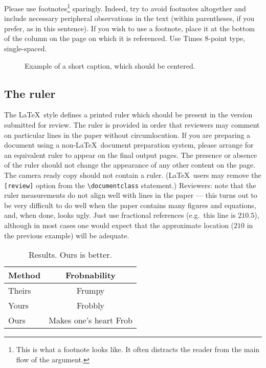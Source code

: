 \documentclass[extendedabs]{recpad2k}
\begin{document}
 Please use footnotes\footnote {This is what a footnote looks like.  It
 often distracts the reader from the main flow of the argument.} sparingly.
 Indeed, try to avoid footnotes altogether and include necessary peripheral
 observations in 
 the text (within parentheses, if you prefer, as in this sentence).  If you
 wish to use a footnote, place it at the bottom of the column on the page on
 which it is referenced. Use Times 8-point type, single-spaced.


\begin{figure*}
\begin{center}
\fbox{\rule{0pt}{2in} \rule{.9\linewidth}{0pt}}
\end{center}
   \caption{Example of a short caption, which should be centered.}
\label{fig:short}
\end{figure*}

\subsection{The ruler}
The \LaTeX\ style defines a printed ruler which should be present in the
version submitted for review.  The ruler is provided in order that
reviewers may comment on particular lines in the paper without
circumlocution.  If you are preparing a document using a non-\LaTeX\
document preparation system, please arrange for an equivalent ruler to
appear on the final output pages.  The presence or absence of the ruler
should not change the appearance of any other content on the page.  The
camera ready copy should not contain a ruler. (\LaTeX\ users may remove
the \verb'[review]' option from the \verb'\documentclass' statement.)
Reviewers: note that the ruler measurements do not align well with lines
in the paper --- this turns out to be very difficult to do well when the
paper contains many figures and equations, and, when done, looks ugly.
Just use fractional references (e.g.\ this line is $210.5$), although in
most cases one would expect that the approximate location ($210$ in the
previous example) will be adequate.


\begin{table}
\begin{center}
\begin{tabular}{|l|c|}
\hline
Method & Frobnability \\
\hline\hline
Theirs & Frumpy \\
Yours & Frobbly \\
Ours & Makes one's heart Frob\\
\hline
\end{tabular}
\end{center}
\caption{Results.   Ours is better.}
\end{table}
\end{document}
